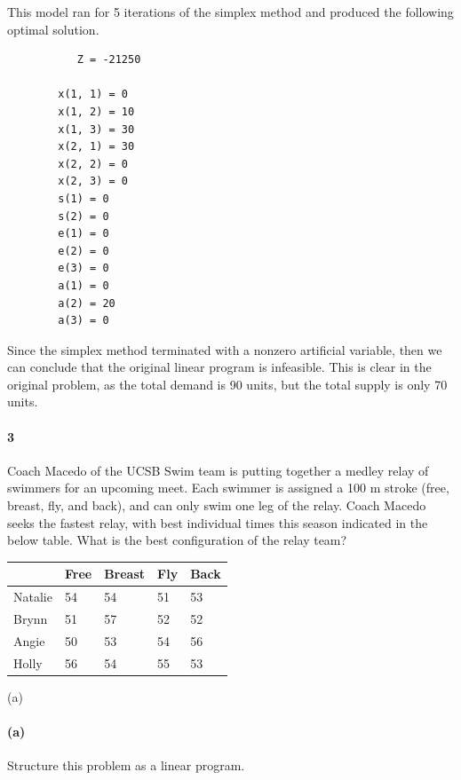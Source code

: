\documentclass[12pt]{article}
\newenvironment{fullbox}{\begin{lrbox}{\savefullbox}\begin{minipage}{\dimexpr\textwidth-2\fboxsep\relax}}{\end{minipage}\end{lrbox}\begin{center}\framebox[\textwidth]{\usebox{\savefullbox}}\end{center}}
\newenvironment{pbox}[1][]{\begin{fullbox}\ifx#1\empty\else\paragraph{#1}\fi}{\end{fullbox}}
\theoremstyle{definition}
\begin{document}
\newpage
This model ran for 5 iterations of the simplex method and produced the following optimal solution.
\begin{verbatim}
           Z = -21250
    
        x(1, 1) = 0
        x(1, 2) = 10
        x(1, 3) = 30
        x(2, 1) = 30
        x(2, 2) = 0
        x(2, 3) = 0
        s(1) = 0
        s(2) = 0
        e(1) = 0
        e(2) = 0
        e(3) = 0
        a(1) = 0
        a(2) = 20
        a(3) = 0
\end{verbatim}
Since the simplex method terminated with a nonzero artificial variable, then we can conclude that the original linear program is infeasible. This is clear in the original problem, as the total demand is 90 units, but the total supply is only 70 units.






\newpage
\begin{pbox}[3]
    Coach Macedo of the UCSB Swim team is putting together a medley relay of swimmers for an upcoming meet. Each swimmer is assigned a 100 m stroke (free, breast, fly, and back), and can only swim one leg of the relay. Coach Macedo seeks the fastest relay, with best individual times this season indicated in the below table. What is the best configuration of the relay team?
    \begin{center}
        \begin{tabular}{|l|l|l|l|l|}
        \hline
                & Free & Breast & Fly & Back \\ \hline
        Natalie & 54   & 54     & 51  & 53   \\ \hline
        Brynn   & 51   & 57     & 52  & 52   \\ \hline
        Angie   & 50   & 53     & 54  & 56   \\ \hline
        Holly   & 56   & 54     & 55  & 53   \\ \hline
        \end{tabular}
    \end{center}
\end{pbox}

\begin{pbox}[(a)]
    Structure this problem as a linear program.
\end{pbox}
\end{document}
